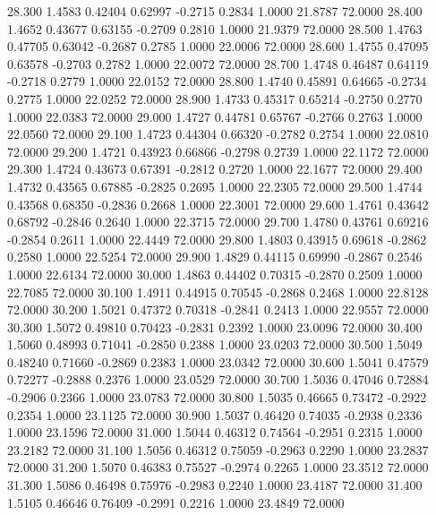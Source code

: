   28.300   1.4583   0.42404   0.62997  -0.2715   0.2834   1.0000  21.8787  72.0000
  28.400   1.4652   0.43677   0.63155  -0.2709   0.2810   1.0000  21.9379  72.0000
  28.500   1.4763   0.47705   0.63042  -0.2687   0.2785   1.0000  22.0006  72.0000
  28.600   1.4755   0.47095   0.63578  -0.2703   0.2782   1.0000  22.0072  72.0000
  28.700   1.4748   0.46487   0.64119  -0.2718   0.2779   1.0000  22.0152  72.0000
  28.800   1.4740   0.45891   0.64665  -0.2734   0.2775   1.0000  22.0252  72.0000
  28.900   1.4733   0.45317   0.65214  -0.2750   0.2770   1.0000  22.0383  72.0000
  29.000   1.4727   0.44781   0.65767  -0.2766   0.2763   1.0000  22.0560  72.0000
  29.100   1.4723   0.44304   0.66320  -0.2782   0.2754   1.0000  22.0810  72.0000
  29.200   1.4721   0.43923   0.66866  -0.2798   0.2739   1.0000  22.1172  72.0000
  29.300   1.4724   0.43673   0.67391  -0.2812   0.2720   1.0000  22.1677  72.0000
  29.400   1.4732   0.43565   0.67885  -0.2825   0.2695   1.0000  22.2305  72.0000
  29.500   1.4744   0.43568   0.68350  -0.2836   0.2668   1.0000  22.3001  72.0000
  29.600   1.4761   0.43642   0.68792  -0.2846   0.2640   1.0000  22.3715  72.0000
  29.700   1.4780   0.43761   0.69216  -0.2854   0.2611   1.0000  22.4449  72.0000
  29.800   1.4803   0.43915   0.69618  -0.2862   0.2580   1.0000  22.5254  72.0000
  29.900   1.4829   0.44115   0.69990  -0.2867   0.2546   1.0000  22.6134  72.0000
  30.000   1.4863   0.44402   0.70315  -0.2870   0.2509   1.0000  22.7085  72.0000
  30.100   1.4911   0.44915   0.70545  -0.2868   0.2468   1.0000  22.8128  72.0000
  30.200   1.5021   0.47372   0.70318  -0.2841   0.2413   1.0000  22.9557  72.0000
  30.300   1.5072   0.49810   0.70423  -0.2831   0.2392   1.0000  23.0096  72.0000
  30.400   1.5060   0.48993   0.71041  -0.2850   0.2388   1.0000  23.0203  72.0000
  30.500   1.5049   0.48240   0.71660  -0.2869   0.2383   1.0000  23.0342  72.0000
  30.600   1.5041   0.47579   0.72277  -0.2888   0.2376   1.0000  23.0529  72.0000
  30.700   1.5036   0.47046   0.72884  -0.2906   0.2366   1.0000  23.0783  72.0000
  30.800   1.5035   0.46665   0.73472  -0.2922   0.2354   1.0000  23.1125  72.0000
  30.900   1.5037   0.46420   0.74035  -0.2938   0.2336   1.0000  23.1596  72.0000
  31.000   1.5044   0.46312   0.74564  -0.2951   0.2315   1.0000  23.2182  72.0000
  31.100   1.5056   0.46312   0.75059  -0.2963   0.2290   1.0000  23.2837  72.0000
  31.200   1.5070   0.46383   0.75527  -0.2974   0.2265   1.0000  23.3512  72.0000
  31.300   1.5086   0.46498   0.75976  -0.2983   0.2240   1.0000  23.4187  72.0000
  31.400   1.5105   0.46646   0.76409  -0.2991   0.2216   1.0000  23.4849  72.0000
